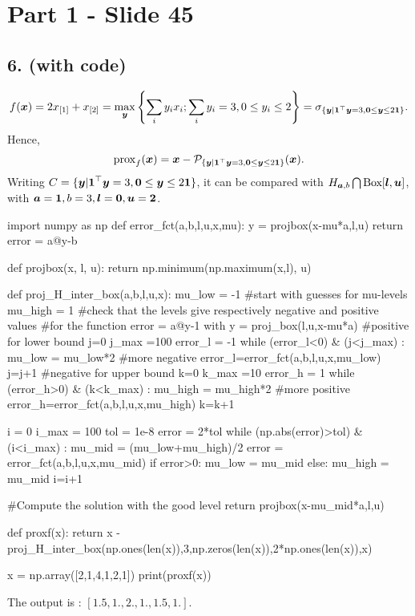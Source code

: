 \section{Part 1 - Slide 45}
%
\subsection{6. (with code)}
%
\begin{equation*}
    f(\boldsymbol x) = 2 x_{[1]} + x_{[2]} 
    = \max_{\boldsymbol y} \left\{ \sum_{i} y_i x_i; \sum_i y_i=3, 0 \le
    y_i \le 2 \right\} = \sigma_{\{ \boldsymbol y|\boldsymbol 1^\top \boldsymbol y = 3, 
    \boldsymbol 0 \le \boldsymbol y \le 2 \boldsymbol 1 \}}.
\end{equation*}
% 
Hence,
%
\begin{equation*}
    \operatorname{prox}_f(\boldsymbol x) = \boldsymbol x - \mathcal P_{\{ \boldsymbol y|\boldsymbol 1^\top \boldsymbol y = 3, 
    \boldsymbol 0 \le \boldsymbol y \le 2 \boldsymbol 1 \}} (\boldsymbol x).
\end{equation*}
%
Writing $C=\{ \boldsymbol y|\boldsymbol 1^\top \boldsymbol y = 3, 
\boldsymbol 0 \le \boldsymbol y \le 2 \boldsymbol 1 \}$, it can be compared with 
$H_{\boldsymbol a, b} \bigcap \text{Box}[\boldsymbol l, \boldsymbol u]$, with 
$\boldsymbol a=\boldsymbol 1, b=3, \boldsymbol l=\boldsymbol 0, \boldsymbol u = \boldsymbol 2$.
%
\begin{python}
import numpy as np
def error_fct(a,b,l,u,x,mu):
    y = projbox(x-mu*a,l,u)
    return error = a@y-b
     
def projbox(x, l, u):
    return np.minimum(np.maximum(x,l), u)

def proj_H_inter_box(a,b,l,u,x):
    mu_low = -1 #start with guesses for mu-levels
    mu_high = 1
    #check that the levels give respectively negative and positive values
    #for the function error = a@y-1 with y = proj_box(l,u,x-mu*a)
    #positive for lower bound
    j=0
    j_max =100
    error_l = -1
    while (error_l<0) & (j<j_max) :
        mu_low = mu_low*2 #more negative
        error_l=error_fct(a,b,l,u,x,mu_low)
        j=j+1
    #negative for upper bound
    k=0
    k_max =10
    error_h = 1
    while (error_h>0) & (k<k_max) :
        mu_high = mu_high*2 #more positive 
        error_h=error_fct(a,b,l,u,x,mu_high)
        k=k+1

    i = 0
    i_max = 100
    tol = 1e-8
    error = 2*tol
    while (np.abs(error)>tol) & (i<i_max) :
        mu_mid = (mu_low+mu_high)/2
        error = error_fct(a,b,l,u,x,mu_mid)
        if error>0:
            mu_low = mu_mid
        else:
            mu_high = mu_mid
        i=i+1

    #Compute the solution with the good level
    return projbox(x-mu_mid*a,l,u)

def proxf(x):
    return x - proj_H_inter_box(np.ones(len(x)),3,np.zeros(len(x)),2*np.ones(len(x)),x)

x = np.array([2,1,4,1,2,1])
print(proxf(x))
\end{python}
%
The output is : $[1.5, 1., 2.,  1.,  1.5, 1. ]$.
%

